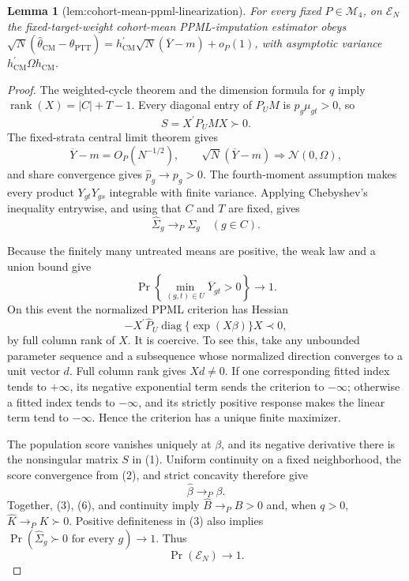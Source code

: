 \documentclass{article}
\newtheorem{lemma}{Lemma}
\begin{document}
\begin{lemma}[lem:cohort-mean-ppml-linearization]\label{lem:cohort-mean-ppml-linearization}
For every fixed \(P\in\mathcal M_4\), on \(\mathcal E_N\) the fixed-target-weight cohort-mean PPML-imputation estimator obeys \(\sqrt N(\widehat\theta_{\mathrm{CM}}-\theta_{\mathrm{PTT}})=h_{\mathrm{CM}}^{\prime}\sqrt N(\overline Y-m)+o_P(1)\), with asymptotic variance \(h_{\mathrm{CM}}^{\prime}\Omega h_{\mathrm{CM}}\).
\end{lemma}
\begin{proof}
The weighted-cycle theorem and the dimension formula for \(q\) imply
\(\operatorname{rank}(X)=|C|+T-1\).  Every diagonal entry of \(P_UM\) is \(p_g\mu_{gt}>0\), so
\[
S=X^{\prime}P_UMX\succ0.                                                \tag{1}
\]
The fixed-strata central limit theorem gives
\[
\overline Y-m=O_P(N^{-1/2}),
\qquad
\sqrt N(\overline Y-m)\Rightarrow\mathcal N(0,\Omega),                 \tag{2}
\]
and share convergence gives \(\widehat p_g\to p_g>0\).  The fourth-moment assumption makes every product \(Y_{gt}Y_{gs}\) integrable with finite variance.  Applying Chebyshev's inequality entrywise, and using that \(C\) and \(T\) are fixed, gives
\[
\widehat\Sigma_g\to_P\Sigma_g\quad(g\in C).                          \tag{3}
\]

Because the finitely many untreated means are positive, the weak law and a union bound give
\[
\Pr\left\{\min_{(g,t)\in U}\overline Y_{gt}>0\right\}\longrightarrow1. \tag{4}
\]
On this event the normalized PPML criterion has Hessian
\[
-X^{\prime}\widehat P_U
 \operatorname{diag}\{\exp(X\beta)\}X\prec0,                          \tag{5}
\]
by full column rank of \(X\).  It is coercive.  To see this, take any unbounded parameter sequence and a subsequence whose normalized direction converges to a unit vector \(d\).  Full column rank gives \(Xd\ne0\).  If one corresponding fitted index tends to \(+\infty\), its negative exponential term sends the criterion to \(-\infty\); otherwise a fitted index tends to \(-\infty\), and its strictly positive response makes the linear term tend to \(-\infty\).  Hence the criterion has a unique finite maximizer.

The population score vanishes uniquely at \(\beta\), and its negative derivative there is the nonsingular matrix \(S\) in (1).  Uniform continuity on a fixed neighborhood, the score convergence from (2), and strict concavity therefore give
\[
\widehat\beta\to_P\beta.                                              \tag{6}
\]
Together, (3), (6), and continuity imply
\(\widehat B\to_PB>0\) and, when \(q>0\),
\(\widehat K\to_PK\succ0\).  Positive definiteness in (3) also implies
\(\Pr(\widehat\Sigma_g\succ0\text{ for every }g)\to1\).  Thus
\[
\Pr(\mathcal E_N)\longrightarrow1.                                    \tag{7}
\]


\end{proof}
\end{document}
